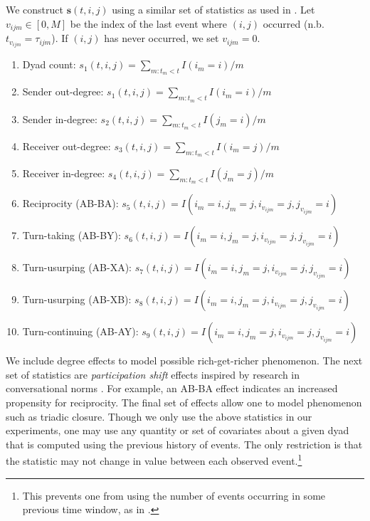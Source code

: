 \documentclass[11pt]{article}
\begin{document}
We construct $\mathbf{s}(t,i,j)$ using a similar set of statistics as used in \cite{Butts2008,Vu2011}. Let $v_{ijm} \in [0,M]$ be the index of the last event where $(i,j)$ occurred (n.b. $t_{v_{ijm}} = \tau_{ijm}$). If $(i,j)$ has never occurred, we set $v_{ijm}=0$.  
\begin{enumerate}
\item Dyad count: $s_{1}(t,i,j) = \sum_{m:t_m<t} I(i_m=i) / m$
\item Sender out-degree: $s_{1}(t,i,j) = \sum_{m:t_m<t} I(i_m=i) / m$
\item Sender in-degree: $s_{2}(t,i,j) = \sum_{m:t_m<t} I(j_m=i) / m$
\item Receiver out-degree: $s_{3}(t,i,j) = \sum_{m:t_m<t} I(i_m=j)/m$
\item Receiver in-degree: $s_{4}(t,i,j) = \sum_{m:t_m<t} I(j_m=j)/m$
\item Reciprocity (AB-BA): $s_{5}(t,i,j) = I(i_m=i,j_m=j,i_{v_{ijm}}=j,j_{v_{ijm}}=i)$
\item Turn-taking (AB-BY): $s_{6}(t,i,j) = I(i_m=i,j_m=j,i_{v_{ijm}}=j,j_{v_{ijm}}=i)$
\item Turn-usurping (AB-XA): $s_{7}(t,i,j) = I(i_m=i,j_m=j,i_{v_{ijm}}=j,j_{v_{ijm}}=i)$
\item Turn-usurping (AB-XB): $s_{8}(t,i,j) = I(i_m=i,j_m=j,i_{v_{ijm}}=j,j_{v_{ijm}}=i)$
\item Turn-continuing (AB-AY): $s_{9}(t,i,j) =  I(i_m=i,j_m=j,i_{v_{ijm}}=j,j_{v_{ijm}}=i)$
\end{enumerate}

We include degree effects to model possible rich-get-richer phenomenon.  The next set of statistics are \emph{participation shift} effects inspired by research in conversational norms \cite{Gibson2003}.  For example, an AB-BA effect indicates an increased propensity for reciprocity.  The final set of effects allow one to model phenomenon such as triadic closure.  Though we only use the above statistics in our experiments, one may use any quantity or set of covariates about a given dyad that is computed using the previous history of events.  The only restriction is that the statistic may not change in value between each observed event.\footnote{This prevents one from using the number of events occurring in some previous time window, as in \cite{Gunawardana2011}.}
\end{document}

